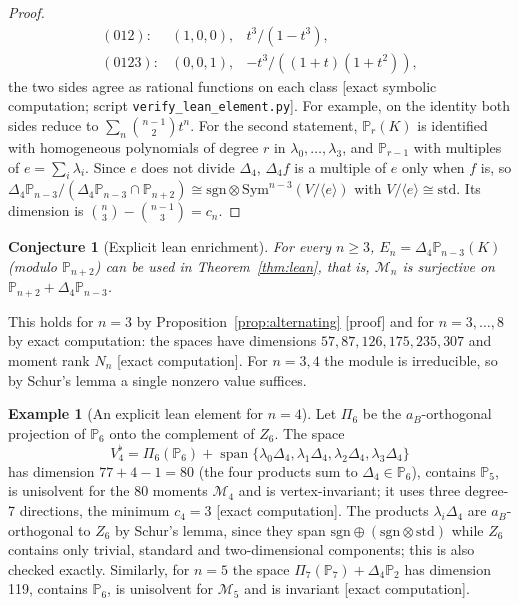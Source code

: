 \documentclass[11pt,a4paper]{article}
\newtheorem{conjecture}[theorem]{Conjecture}
\theoremstyle{definition}
\newtheorem{example}[theorem]{Example}
\theoremstyle{remark}
\newcommand{\M}{\mathcal M}
\newcommand{\evid}[1]{\textsf{[#1]}}
\newcommand{\Pol}{\mathbb P}
\begin{document}
\begin{proof}
\[\begin{array}{lll}
 (012):&(1,0,0),&t^3/(1-t^3),\\
 (0123):&(0,0,1),&-t^3/((1+t)(1+t^2)),
\end{array}
\]
the two sides agree as rational functions on each class
\evid{exact symbolic computation; script \texttt{verify\_lean\_element.py}}.
For example, on the identity both sides reduce to \(\sum_n\binom{n-1}2t^n\).
For the second statement, \(\Pol_r(K)\) is identified with homogeneous
polynomials of degree \(r\) in \(\lambda_0,\dots,\lambda_3\), and \(\Pol_{r-1}\)
with multiples of \(e=\sum_i\lambda_i\). Since \(e\) does not divide
\(\Delta_4\), \(\Delta_4f\) is a multiple of \(e\) only when \(f\) is, so
\(\Delta_4\Pol_{n-3}/(\Delta_4\Pol_{n-3}\cap\Pol_{n+2})\cong
\mathrm{sgn}\otimes\mathrm{Sym}^{n-3}(V/\langle e\rangle)\) with
\(V/\langle e\rangle\cong\mathrm{std}\). Its dimension is
\(\binom{n}{3}-\binom{n-1}3=c_n\).
\end{proof}

\begin{conjecture}[Explicit lean enrichment]
\label{conj:lean}
For every \(n\ge3\), \(E_n=\Delta_4\Pol_{n-3}(K)\) (modulo \(\Pol_{n+2}\))
can be used in Theorem~\ref{thm:lean}, that is,
\(\M_n\) is surjective on \(\Pol_{n+2}+\Delta_4\Pol_{n-3}\).
\end{conjecture}

This holds for \(n=3\) by Proposition~\ref{prop:alternating} \evid{proof}
and for \(n=3,\dots,8\) by exact computation: the spaces have dimensions
\(57,87,126,175,235,307\) and moment rank \(N_n\) \evid{exact computation}.
For \(n=3,4\) the module is irreducible, so by Schur's lemma a single
nonzero value suffices.

\begin{example}[An explicit lean element for \(n=4\)]
\label{ex:n4}
Let \(\Pi_6\) be the \(a_B\)-orthogonal projection of \(\Pol_6\) onto the
complement of \(Z_6\). The space
\[
 V_4^\flat=\Pi_6(\Pol_6)+\operatorname{span}\{\lambda_0\Delta_4,\lambda_1\Delta_4,
 \lambda_2\Delta_4,\lambda_3\Delta_4\}
\]
has dimension \(77+4-1=80\) (the four products sum to \(\Delta_4\in\Pol_6\)),
contains \(\Pol_5\), is unisolvent for the 80 moments \(\M_4\) and is
vertex-invariant; it uses three degree-7 directions, the minimum
\(c_4=3\) \evid{exact computation}. The products \(\lambda_i\Delta_4\) are
\(a_B\)-orthogonal to \(Z_6\) by Schur's lemma, since they span
\(\mathrm{sgn}\oplus(\mathrm{sgn}\otimes\mathrm{std})\) while \(Z_6\) contains
only trivial, standard and two-dimensional components; this is also
checked exactly. Similarly, for \(n=5\) the space
\(\Pi_7(\Pol_7)+\Delta_4\Pol_2\) has dimension 119, contains \(\Pol_6\), is
unisolvent for \(\M_5\) and is invariant \evid{exact computation}.
\end{example}
\end{document}
